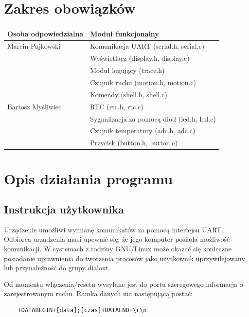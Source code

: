 \documentclass{article}
\begin{document}
\newpage
\section{Zakres obowiązków}

\begin{tabular}{|l|l|}
    \hline
    Osoba odpowiedzialna & Moduł funkcjonalny\\
    \hline
    Marcin Pajkowski
    & Komunikacja UART (serial.h, serial.c)\\
    & Wyświetlacz (display.h, display.c)\\
    & Moduł logujący (trace.h)\\
    & Czujnik ruchu (motion.h, motion.c)\\
    & Komendy (shell.h, shell.c)\\
    \hline
    Bartosz Myśliwiec
    & RTC (rtc.h, rtc.c)\\
    & Sygnalizacja za pomocą diod (led.h, led.c)\\
    & Czujnik temperatury (adc.h, adc.c)\\
    & Przycisk (button.h, button.c)\\
    \hline
\end{tabular}


\section{Opis działania programu}
\subsection{Instrukcja użytkownika}

Urządzenie umożliwi wymianę komunikatów za pomocą interfejsu UART. Odbiorca urządzenia
musi upewnić się, że jego komputer posiada możliwość komunikacji. W systemach
z rodziny GNU/Linux może okazać się konieczne posiadanie uprawnienia do tworzenia
procesów jako użytkownik uprzywilejowany lub przynależność do grupy dialout.

Od momentu włączenia/resetu wysyłane jest do portu szeregowego informacja o zarejestrowanym
ruchu. Ramka danych ma następującą postać:

\begin{lstlisting}
    +DATABEGIN+[data];[czas]+DATAEND+\r\n
\end{lstlisting}
\end{document}

